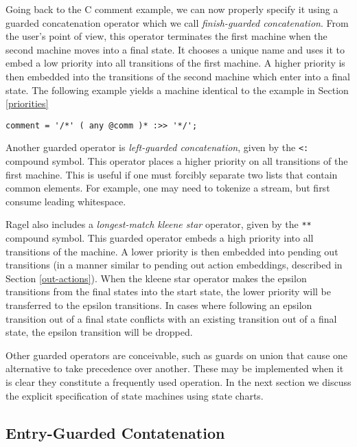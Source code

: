\documentclass[letterpaper,11pt,oneside]{book}
\newenvironment{inline_code}{\def\baselinestretch{1}\vspace{12pt}\small}{}
\begin{document}
Going back to the C comment example, we can now properly specify
it using a guarded concatenation operator which we call {\em finish-guarded
concatenation}. From the user's point of view, this operator terminates the
first machine when the second machine moves into a final state.  It chooses a
unique name and uses it to embed a low priority into all
transitions of the first machine. A higher priority is then embedded into the
transitions of the second machine which enter into a final state. The following
example yields a machine identical to the example in Section \ref{priorities}

\begin{inline_code}
\begin{verbatim}
comment = '/*' ( any @comm )* :>> '*/';
\end{verbatim}
\end{inline_code}

Another guarded operator is {\em left-guarded concatenation}, given by the
\verb|<:| compound symbol. This operator places a higher priority on all
transitions of the first machine. This is useful if one must forcibly separate
two lists that contain common elements. For example, one may need to tokenize a
stream, but first consume leading whitespace.

Ragel also includes a {\em longest-match kleene star} operator, given by the
\verb|**| compound symbol. This 
guarded operator embeds a high
priority into all transitions of the machine. 
A lower priority is then embedded into pending out transitions
(in a manner similar to pending out action embeddings, described in Section
\ref{out-actions}).  When the kleene star operator makes the epsilon transitions from
the final states into the start state, the lower priority will be transferred
to the epsilon transitions. In cases where following an epsilon transition
out of a final state conflicts with an existing transition out of a final
state, the epsilon transition will be dropped.

Other guarded operators are conceivable, such as guards on union that cause one
alternative to take precedence over another. These may be implemented when it
is clear they constitute a frequently used operation.
In the next section we discuss the explicit specification of state machines
using state charts.

\subsection{Entry-Guarded Contatenation}
\end{document}
